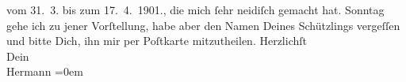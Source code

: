 \begin{ledgroupsized}[t]{13cm}
{{{                  vom 31. 3. bis zum 17. 4. 1901.}}}\label{K_L01115_1h}, die mich ſehr
               neidiſch gemacht hat.\pend
           \pstart
           Sonntag gehe ich zu jener Vorſtellung, habe aber den Namen Deines Schützlings vergeſſen und bitte Dich, ihn
               mir per Poſtkarte mitzutheilen.\pend
           \pstart
           Herzlichſt{\\[\baselineskip]}Dein{\\[\baselineskip]}\spacefill\mbox{Hermann}\pend
           \leftskip=0em{}
         
         \endnumbering{}\end{ledgroupsized}  \newcommand{\dateiname}{L01115}\newcommand{\titel}{Hermann Bahr an Arthur Schnitzler, 25. 4. [1901]}\newcommand{\editorInnen}{ Kurt Ifkovits,  Martin Anton Müller}
      